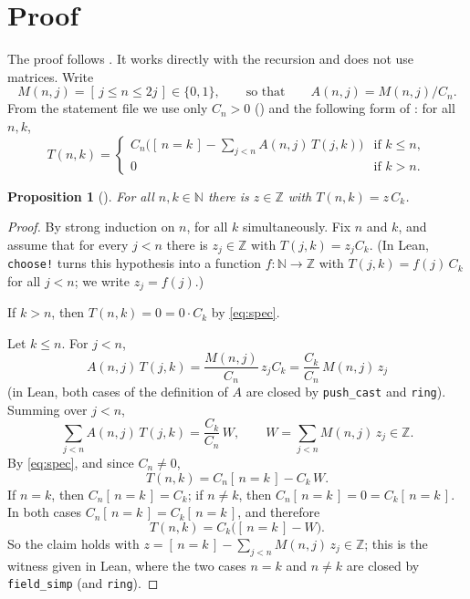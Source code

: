 \documentclass[11pt]{amsart}
\theoremstyle{plain}
\newtheorem{proposition}[theorem]{Proposition}
\theoremstyle{definition}
\newcommand{\N}{\mathbb{N}}
\newcommand{\Z}{\mathbb{Z}}
\newcommand{\ib}[1]{[\,#1\,]}
\begin{document}
\section{Proof}\label{sec:proof}

The proof follows . It works directly with the recursion  and does not use matrices. Write
\[
  M(n,j)=\ib{j\le n\le 2j}\in\{0,1\},\qquad\text{so that}\qquad A(n,j)=M(n,j)/C_n .
\]
From the statement file we use only $C_n>0$ () and the following form of : for all $n,k$,
\begin{equation}\label{eq:spec}
  T(n,k)=\begin{cases} C_n\bigl(\ib{n=k}-\sum_{j<n}A(n,j)\,T(j,k)\bigr) & \text{if } k\le n,\\ 0 & \text{if } k>n.\end{cases}
\end{equation}

\begin{proposition}[]\label{prop:mult}
For all $n,k\in\N$ there is $z\in\Z$ with $T(n,k)=z\,C_k$.
\end{proposition}

\begin{proof}
By strong induction on $n$, for all $k$ simultaneously. Fix $n$ and $k$, and assume that for every $j<n$ there is $z_j\in\Z$ with $T(j,k)=z_jC_k$. (In Lean, \texttt{choose!} turns this hypothesis into a function $f\colon\N\to\Z$ with $T(j,k)=f(j)\,C_k$ for all $j<n$; we write $z_j=f(j)$.)

If $k>n$, then $T(n,k)=0=0\cdot C_k$ by \eqref{eq:spec}.

Let $k\le n$. For $j<n$,
\[
  A(n,j)\,T(j,k)=\frac{M(n,j)}{C_n}\,z_jC_k=\frac{C_k}{C_n}\,M(n,j)\,z_j
\]
(in Lean, both cases of the definition of $A$ are closed by \texttt{push\_cast} and \texttt{ring}). Summing over $j<n$,
\[
  \sum_{j<n}A(n,j)\,T(j,k)=\frac{C_k}{C_n}\,W,\qquad W=\sum_{j<n}M(n,j)\,z_j\in\Z .
\]
By \eqref{eq:spec}, and since $C_n\neq0$,
\[
  T(n,k)=C_n\ib{n=k}-C_k\,W .
\]
If $n=k$, then $C_n\ib{n=k}=C_k$; if $n\ne k$, then $C_n\ib{n=k}=0=C_k\ib{n=k}$. In both cases $C_n\ib{n=k}=C_k\ib{n=k}$, and therefore
\[
  T(n,k)=C_k\bigl(\ib{n=k}-W\bigr).
\]
So the claim holds with $z=\ib{n=k}-\sum_{j<n}M(n,j)\,z_j\in\Z$; this is the witness given in Lean, where the two cases $n=k$ and $n\neq k$ are closed by \texttt{field\_simp} (and \texttt{ring}).
\end{proof}
\end{document}
